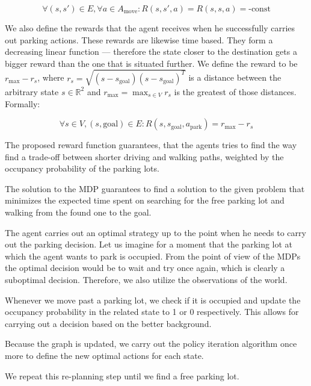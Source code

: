     \begin{equation}
        \forall (s, s') \in E, \forall a \in A_{\mbox{move}}: R(s, s', a) = R(s, s, a) = \mbox{-const}
    \end{equation}

    We also define the rewards that the agent receives when he successfully
    carries out parking actions. These rewards are likewise time based. They
    form a decreasing linear function --- therefore the state closer to the
    destination gets a bigger reward than the one that is situated further. We
    define the reward to be $r_{\max} - r_s$, where $r_s = \sqrt{(s -
    s_{\mbox{goal}}) {(s - s_{\mbox{goal}})}^T}$ is a distance between the
    arbitrary state $s \in \mathbb{R}^2$ and $r_{\max} = \max_{s \in V}r_s$ is
    the greatest of those distances. Formally:

    \begin{equation}
        \forall s \in V, (s,\mbox{goal}) \in E : R(s, s_{\mbox{goal}}, a_{\mbox{park}}) = r_{\max} - r_s
    \end{equation}

    The proposed reward function guarantees, that the agents tries to find the
    way find a trade-off between shorter driving and walking paths, weighted
    by the occupancy probability of the parking lots.

    The solution to the MDP guarantees to find a solution to the given problem
    that minimizes the expected time spent on searching for the free parking
    lot and walking from the found one to the goal.


    The agent carries out an optimal strategy up to the point when he needs to
    carry out the parking decision. Let us imagine for a moment that the
    parking lot at which the agent wants to park is occupied. From the point
    of view of the MDPs the optimal decision would be to wait and try once
    again, which is clearly a suboptimal decision. Therefore, we also utilize
    the observations of the world.

    Whenever we move past a parking lot, we check if it is occupied and update
    the occupancy probability in the related state to 1 or 0 respectively.
    This allows for carrying out a decision based on the better background.

    Because the graph is updated, we carry out the policy iteration algorithm
    once more to define the new optimal actions for each state.

    We repeat this re-planning step until we find a free parking lot.

